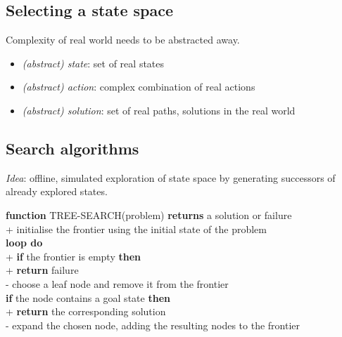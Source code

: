 \documentclass{article}
\begin{document}
\subsection{Selecting a state space}

Complexity of real world needs to be abstracted away.
\begin{itemize}
    \item \emph{(abstract) state}: set of real states
    \item \emph{(abstract) action}: complex combination of real actions
    \item \emph{(abstract) solution}: set of real paths, solutions in the real world
\end{itemize}

\subsection{Search algorithms}

\emph{Idea}: offline, simulated exploration of state space by generating successors of already
explored states.

\begin{pseudo}
\textbf{function} TREE-SEARCH(problem) \textbf{returns} a solution or failure   \\+
    initialise the frontier using the initial state of the problem              \\
    \textbf{loop do}                                                            \\+
        \textbf{if} the frontier is empty \textbf{then}                          \\+
            \textbf{return} failure                                             \\-
        choose a leaf node and remove it from the frontier                      \\
        \textbf{if} the node contains a goal state \textbf{then}                \\+
            \textbf{return} the corresponding solution                          \\-
        expand the chosen node, adding the resulting nodes to the frontier
\end{pseudo}
\end{document}
